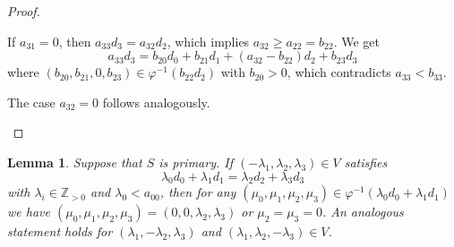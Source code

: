 \documentclass[12pt]{article}
\newtheorem{lemma}[thm]{Lemma}
\theoremstyle{remark}
\begin{document}
\begin{proof}
\begin{itemize}
    If $a_{31} = 0$, then $a_{33}d_3 = a_{32}d_2$, which implies $a_{32} \geq a_{22} = b_{22}$. We get 
    \begin{equation}
        a_{33}d_3 = b_{20}d_0 + b_{21}d_1 + (a_{32}-b_{22})d_2 + b_{23}d_3
    \end{equation}
    where $(b_{20},b_{21},0,b_{23}) \in \varphi^{-1}(b_{22}d_2)$ with $b_{20} > 0$, which contradicts $a_{33} < b_{33}$.

    The case $a_{32}=0$ follows analogously. \qedhere


\end{itemize}
\end{proof}

\begin{lemma}\label{lemma_catenary_help_primary}
    Suppose that $S$ is primary.  If $(-\lambda_1,\lambda_2,\lambda_3) \in V$ satisfies
    $$ \lambda_0d_0 + \lambda_1d_1 = \lambda_2d_2 + \lambda_3d_3$$
    with $\lambda_i \in \mathbb{Z}_{>0}$ and $\lambda_0 < a_{00}$, then for any $(\mu_0,\mu_1,\mu_2,\mu_3) \in \varphi^{-1}(\lambda_0d_0 + \lambda_1d_1)$ we have $(\mu_0,\mu_1,\mu_2,\mu_3) = (0,0,\lambda_2,\lambda_3)$ or $\mu_2=\mu_3 = 0$. An analogous statement holds for $(\lambda_1,-\lambda_2,\lambda_3)$ and $(\lambda_1,\lambda_2,-\lambda_3) \in V$.
\end{lemma}  
\end{document}
